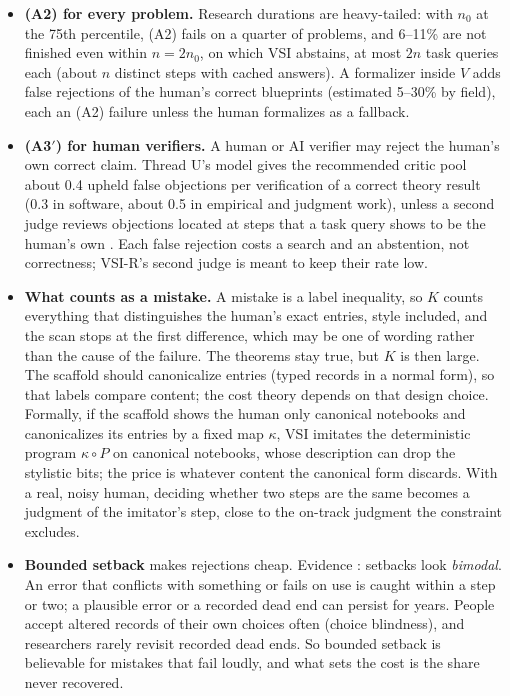 \documentclass[11pt]{article}
\theoremstyle{definition}
\theoremstyle{remark}
\newcommand{\K}{K}
\begin{document}
\begin{itemize}
\item \textbf{(A2) for every problem.} Research durations are heavy-tailed: with $n_0$ at the 75th percentile, (A2) fails on a quarter of problems, and 6--11\% are not finished even within $n=2n_0$, on which VSI abstains, at most $2n$ task queries each (about $n$ distinct steps with cached answers). A formalizer inside $V$ adds false rejections of the human's correct blueprints (estimated 5--30\% by field), each an (A2) failure unless the human formalizes as a fallback.
\item \textbf{(A3$'$) for human verifiers.} A human or AI verifier may reject the human's own correct claim. Thread U's model gives the recommended critic pool about 0.4 upheld false objections per verification of a correct theory result (0.3 in software, about 0.5 in empirical and judgment work), unless a second judge reviews objections located at steps that a task query shows to be the human's own \cite{threadU}. Each false rejection costs a search and an abstention, not correctness; VSI-R's second judge is meant to keep their rate low.
\item \textbf{What counts as a mistake.} A mistake is a label inequality, so $\K$ counts everything that distinguishes the human's exact entries, style included, and the scan stops at the first difference, which may be one of wording rather than the cause of the failure. The theorems stay true, but $\K$ is then large. The scaffold should canonicalize entries (typed records in a normal form), so that labels compare content; the cost theory depends on that design choice. Formally, if the scaffold shows the human only canonical notebooks and canonicalizes its entries by a fixed map $\kappa$, VSI imitates the deterministic program $\kappa\circ P$ on canonical notebooks, whose description can drop the stylistic bits; the price is whatever content the canonical form discards. With a real, noisy human, deciding whether two steps are the same becomes a judgment of the imitator's step, close to the on-track judgment the constraint excludes.
\item \textbf{Bounded setback} makes rejections cheap. Evidence \cite{threadL}: setbacks look \emph{bimodal}. An error that conflicts with something or fails on use is caught within a step or two; a plausible error or a recorded dead end can persist for years. People accept altered records of their own choices often (choice blindness), and researchers rarely revisit recorded dead ends. So bounded setback is believable for mistakes that fail loudly, and what sets the cost is the share never recovered.

\end{itemize}
\end{document}
